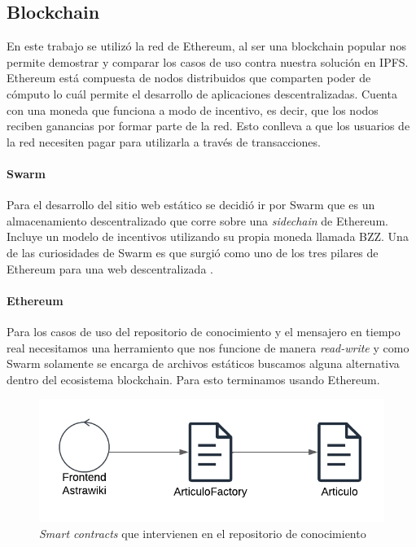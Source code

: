 \subsection{Blockchain}

En este trabajo se utilizó la red de Ethereum, al ser una blockchain popular nos permite demostrar y comparar los casos de uso contra nuestra solución en IPFS. Ethereum está compuesta de nodos distribuidos que comparten poder de cómputo lo cuál permite el desarrollo de aplicaciones descentralizadas. Cuenta con una moneda que funciona a modo de incentivo, es decir, que los nodos reciben ganancias por formar parte de la red. Esto conlleva a que los usuarios de la red necesiten pagar para utilizarla a través de transacciones.

\paragraph{Swarm}

Para el desarrollo del sitio web estático se decidió ir por Swarm que es un almacenamiento descentralizado que corre sobre una \textit{sidechain} de Ethereum. Incluye un modelo de incentivos utilizando su propia moneda llamada BZZ. Una de las curiosidades de Swarm es que surgió como uno de los tres pilares de Ethereum para una web descentralizada \cite{swarm-origin}.

\paragraph{Ethereum}

Para los casos de uso del repositorio de conocimiento y el mensajero en tiempo real necesitamos una herramiento que nos funcione de manera \textit{read-write} y como Swarm solamente se encarga de archivos estáticos buscamos alguna alternativa dentro del ecosistema blockchain. Para esto terminamos usando Ethereum.

\begin{figure}[h!]
    \centering
    \includegraphics[width=0.5\linewidth]{img/astrawiki-articulo-factory.png}
    \caption{\textit{Smart contracts} que intervienen en el repositorio de conocimiento}
    \label{fig:aw-eth-articulo-factory}
\end{figure}

